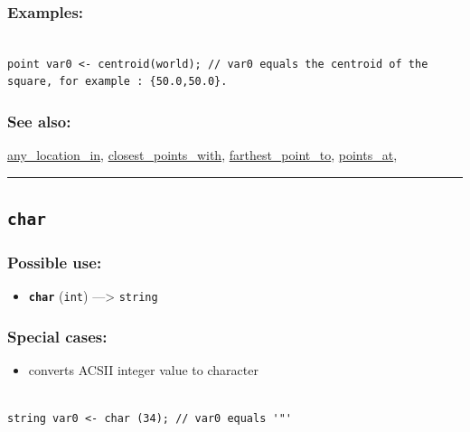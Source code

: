 \documentclass[]{book}
\providecommand{\tightlist}{%
  \setlength{\itemsep}{0pt}\setlength{\parskip}{0pt}}
\theoremstyle{definition}
\theoremstyle{definition}
\theoremstyle{definition}
\theoremstyle{remark}
\begin{document}
\subsubsection{Examples:}\label{examples-63}

\begin{verbatim}
 
point var0 <- centroid(world); // var0 equals the centroid of the square, for example : {50.0,50.0}.
\end{verbatim}

\subsubsection{See also:}\label{see-also-51}

\href{operators-a-to-a.html\#any_location_in}{any\_location\_in},
\href{operators-b-to-c.html\#closest_points_with}{closest\_points\_with},
\href{operators-d-to-h.html\#farthest_point_to}{farthest\_point\_to},
\href{operators-n-to-r.html\#points_at}{points\_at},

\begin{center}\rule{0.5\linewidth}{\linethickness}\end{center}

\subsection{\texorpdfstring{\texttt{char}}{char}}\label{char}

\subsubsection{Possible use:}\label{possible-use-82}

\begin{itemize}
\tightlist
\item
  \textbf{\texttt{char}} (\texttt{int}) ---\textgreater{}
  \texttt{string}
\end{itemize}

\subsubsection{Special cases:}\label{special-cases-27}

\begin{itemize}
\tightlist
\item
  converts ACSII integer value to character
\end{itemize}

\begin{verbatim}
 
string var0 <- char (34); // var0 equals '"'
\end{verbatim}
\end{document}
